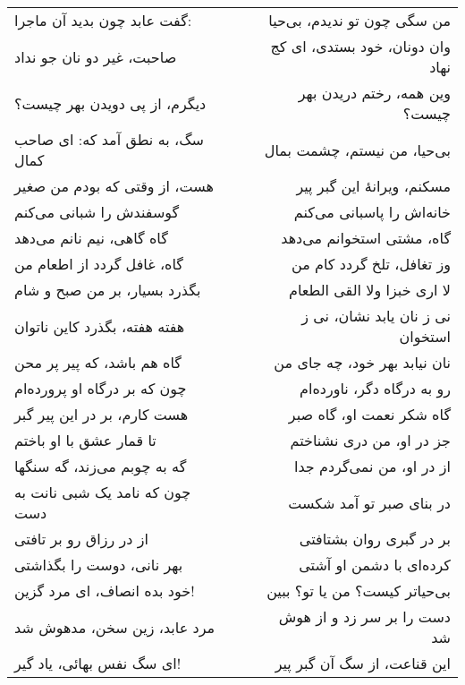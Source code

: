 \begin{center}
\begin{longtable}{l p{0.5cm} r}
گفت عابد چون بدید آن ماجرا:
&&
من سگی چون تو ندیدم، بی‌حیا
\\
صاحبت، غیر دو نان جو نداد
&&
وان دونان، خود بستدی، ای کج نهاد
\\
دیگرم، از پی دویدن بهر چیست؟
&&
وین همه، رختم دریدن بهر چیست؟
\\
سگ، به نطق آمد که: ای صاحب کمال
&&
بی‌حیا، من نیستم، چشمت بمال
\\
هست، از وقتی که بودم من صغیر
&&
مسکنم، ویرانهٔ این گبر پیر
\\
گوسفندش را شبانی می‌کنم
&&
خانه‌اش را پاسبانی می‌کنم
\\
گاه گاهی، نیم نانم می‌دهد
&&
گاه، مشتی استخوانم می‌دهد
\\
گاه، غافل گردد از اطعام من
&&
وز تغافل، تلخ گردد کام من
\\
بگذرد بسیار، بر من صبح و شام
&&
لا اری خبزا ولا القی الطعام
\\
هفته هفته، بگذرد کاین ناتوان
&&
نی ز نان یابد نشان، نی ز استخوان
\\
گاه هم باشد، که پیر پر محن
&&
نان نیابد بهر خود، چه جای من
\\
چون که بر درگاه او پرورده‌ام
&&
رو به درگاه دگر، ناورده‌ام
\\
هست کارم، بر در این پیر گبر
&&
گاه شکر نعمت او، گاه صبر
\\
تا قمار عشق با او باختم
&&
جز در او، من دری نشناختم
\\
گه به چوبم می‌زند، گه سنگها
&&
از در او، من نمی‌گردم جدا
\\
چون که نامد یک شبی نانت به دست
&&
در بنای صبر تو آمد شکست
\\
از در رزاق رو بر تافتی
&&
بر در گبری روان بشتافتی
\\
بهر نانی، دوست را بگذاشتی
&&
کرده‌ای با دشمن او آشتی
\\
خود بده انصاف، ای مرد گزین!
&&
بی‌حیاتر کیست؟ من یا تو؟ ببین
\\
مرد عابد، زین سخن، مدهوش شد
&&
دست را بر سر زد و از هوش شد
\\
ای سگ نفس بهائی، یاد گیر!
&&
این قناعت، از سگ آن گبر پیر
\\
\end{longtable}
\end{center}
